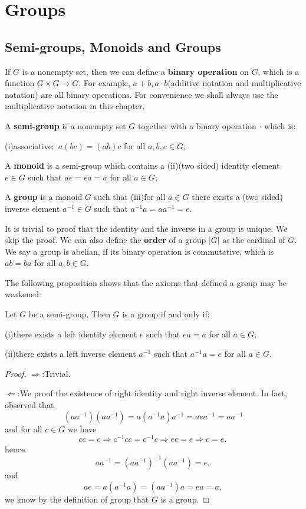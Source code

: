 \section{Groups}
\subsection{Semi-groups, Monoids and Groups}
If $G$ is a nonempty set, then we can define a \textbf{binary operation} on $G$, which is a function $G\times G\to G$. For example, $a+b,a\cdot b$(additive notation and multiplicative notation) are all binary operations. For convenience we shall always use the multiplicative notation in this chapter.
\begin{definition}
A \textbf{semi-group} is a nonempty set $G$ together with a binary operation $\cdot$ which is:\par
(i)associative:\ $a(bc)=(ab)c$ for all $a,b,c\in G$;\par
A \textbf{monoid} is a semi-group which contains a
(ii)(two sided) identity element $e\in G$ such that $ae=ea=a$ for all $a\in G$;\par
A \textbf{group} is a monoid $G$ such that 
(iii)for all $a\in G$ there exists a (two sided) inverse element $a^{-1}\in G$ such that $a^{-1}a=aa^{-1}=e$.
\end{definition}
It is trivial to proof that the identity and the inverse in a group is unique. We skip the proof. We can also define the \textbf{order} of a group $|G|$ as the cardinal of $G$. We say a group is abelian, if its binary operation is commutative, which is $ab=ba$ for all $a,b\in G$.\par
The following proposition shows that the axioms that defined a group may be weakened:
\begin{proposition}
Let $G$ be a semi-group. Then $G$ is a group if and only if:\par
(i)there exists a left identity element $e$ such that $ea=a$ for all $a\in G$;\par
(ii)there exists a left inverse element $a^{-1}$ such that $a^{-1}a=e$ for all $a\in G$.\par
\end{proposition}
\begin{proof}
$\Rightarrow$:Trivial.\par
$\Leftarrow$:We proof the existence of right identity and right inverse element. In fact, observed that
$$(aa^{-1})(aa^{-1})=a(a^{-1}a)a^{-1}=aea^{-1}=aa^{-1}$$
and for all $c\in G$ we have 
$$cc=c\Rightarrow c^{-1}cc=c^{-1}c\Rightarrow ec=e\Rightarrow c=e,$$
hence 
$$aa^{-1}=(aa^{-1})^{-1}(aa^{-1})=e,$$
and 
$$ae=a(a^{-1}a)=(aa^{-1})a=ea=a,$$
we know by the definition of group that $G$ is a group. 
\end{proof}
